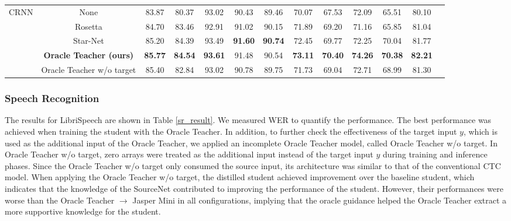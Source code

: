 \documentclass[journal]{IEEEtran}
\begin{document}
\begin{table}[t]
{{\begin{tabular}{|c|c|c|c|c|c|c|c|c|c|c|c|c|}
\hline
\multirow{5}{*}{CRNN \cite{crnn:scheme}} & None    & 83.87          & 80.37          & 93.02              & 90.43          & 89.46          & 70.07          & 67.53          & 72.09          & 65.51          & 80.10          \\
&Rosetta \cite{rosetta:scheme} &   84.70          & 83.46          & 92.91                 & 91.02          & 90.15          & 71.89          & 69.20          & 71.16          & 65.85          & 81.04          \\
&Star-Net \cite{starnet:scheme} &   85.20          & 84.39          & 93.49         & \textbf{91.60} & \textbf{90.74} & 72.45          & 69.77          & 72.25          & 70.04          & 81.77          \\
&\textbf{Oracle Teacher (ours)}& \textbf{85.77} & \textbf{84.54} & \textbf{93.61}         & 91.48          & 90.54          & \textbf{73.11} & \textbf{70.40} & \textbf{74.26} & \textbf{70.38} & \textbf{82.21} \\
&Oracle Teacher w/o target& 85.40 & 82.84 & 93.02 & 90.78 & 89.75 & 71.73 & 69.04 & 72.71 & 68.99 & 81.30 \\
\hline
\end{tabular}%
\label{str_results}
}}
\end{table}



\subsubsection{Speech Recognition} 
The results for LibriSpeech are shown in Table \ref{sr_result}.
We measured WER to quantify the performance.
The best performance was achieved when training the student with the Oracle Teacher.
In addition, to further check the effectiveness of the target input $y$, which is used as the additional input of the Oracle Teacher, we applied an incomplete Oracle Teacher model, called Oracle Teacher w/o target.
In Oracle Teacher w/o target, zero arrays were treated as the additional input instead of the target input $y$ during training and inference phases.
Since the Oracle Teacher w/o target only consumed the source input, its architecture was similar to that of the conventional CTC model.
When applying the Oracle Teacher w/o target, the distilled student achieved improvement over the baseline student, which indicates that the knowledge of the SourceNet contributed to improving the performance of the student.
However, their performances were worse than the Oracle Teacher $\rightarrow$ Jasper Mini in all configurations, implying that the oracle guidance helped the Oracle Teacher extract a more supportive knowledge for the student.
\end{document}
